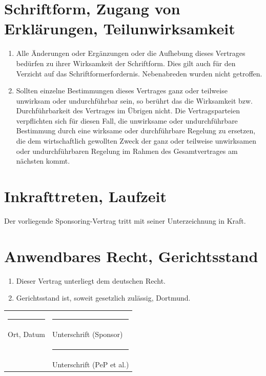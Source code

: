\documentclass[
  paper=a4,
  fontsize=12pt,
  DIV=16,
  parskip=full,
  headinclude=true,
]{scrartcl}
\begin{document}
\section{Schriftform, Zugang von Erklärungen, Teilunwirksamkeit}

\begin{enumerate}[\qquad(1)]
  \item Alle Änderungen oder Ergänzungen oder die Aufhebung dieses
        Vertrages bedürfen zu ihrer Wirksamkeit der Schriftform. Dies gilt auch
        für den Verzicht auf das Schriftformerfordernis. Nebenabreden wurden
        nicht getroffen.
  \item Sollten einzelne Bestimmungen dieses Vertrages ganz oder teilweise
        unwirksam  oder undurchführbar sein, so berührt das die Wirksamkeit bzw.
        Durchführbarkeit des Vertrages im Übrigen nicht. Die Vertragsparteien
        verpflichten sich für diesen Fall, die unwirksame oder undurchführbare
        Bestimmung durch eine wirksame oder durchführbare Regelung zu ersetzen,
        die dem wirtschaftlich gewollten Zweck der ganz oder teilweise
        unwirksamen oder undurchführbaren Regelung im Rahmen des Gesamtvertrages
        am nächsten kommt.
\end{enumerate}

\section{Inkrafttreten, Laufzeit}

Der vorliegende Sponsoring-Vertrag tritt mit seiner Unterzeichnung in Kraft.

\section{Anwendbares Recht, Gerichtsstand}

\begin{enumerate}[\qquad(1)]
  \item Dieser Vertrag unterliegt dem deutschen Recht.
  \item Gerichtsstand ist, soweit gesetzlich zulässig, Dortmund.
\end{enumerate}

\vspace{2cm}
\begin{tabular}{@{}p{}@{}p{}@{}}%
\rule{6cm}{1pt} & \rule{7cm}{1pt} \\
Ort, Datum & Unterschrift (Sponsor)\\[2cm]
 & \rule{7cm}{1pt} \\
 & Unterschrift (PeP et al.)
\end{tabular}
\end{document}
